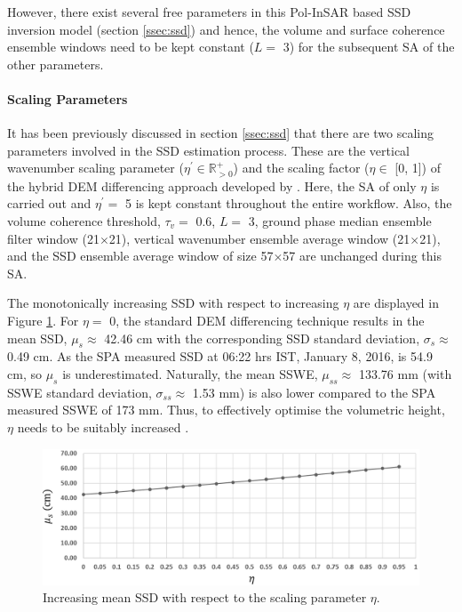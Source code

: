 \documentclass[review]{elsarticle}
\numberwithin{equation}{section}
\numberwithin{figure}{section}
\numberwithin{table}{section}
\begin{document}
However, there exist several free parameters in this Pol-InSAR based SSD inversion model (section \ref{ssec:ssd}) and hence, the volume and surface coherence ensemble windows need to be kept constant ($L =$ 3) for the subsequent SA of the other parameters.

\paragraph*{Scaling Parameters}

It has been previously discussed in section \ref{ssec:ssd} that there are two scaling parameters involved in the SSD estimation process. These are the vertical wavenumber scaling parameter ($\eta^\prime\in\mathbb{R}_{>0}^+$) and the scaling factor ($\eta\in$ [0, 1]) of the hybrid DEM differencing approach developed by \cite{Cloude2010}. Here, the SA of only $\eta$ is carried out and $\eta^\prime = $ 5 is kept constant throughout the entire workflow. Also, the volume coherence threshold, $\tau_v = $ 0.6, $L =$ 3, ground phase median ensemble filter window (21$\times$21), vertical wavenumber ensemble average window (21$\times$21), and the SSD ensemble average window of size 57$\times$57 are unchanged during this SA.

The monotonically increasing SSD with respect to increasing $\eta$ are displayed in Figure \ref{fig:eta}. For $\eta =$ 0, the standard DEM differencing technique \citep{Cloude2005} results in the mean SSD, $\mu_s \approx$ 42.46 cm with the corresponding SSD standard deviation, $\sigma_s \approx$ 0.49 cm. As the SPA measured SSD at 06:22 hrs IST, January 8, 2016, is 54.9 cm, so $\mu_s$ is underestimated. Naturally, the mean SSWE, $\mu_{ss} \approx$ 133.76 mm (with SSWE standard deviation, $\sigma_{ss} \approx$ 1.53 mm) is also lower compared to the SPA measured SSWE of 173 mm. Thus, to effectively optimise the volumetric height, $\eta$ needs to be suitably increased \citep{Cloude2005, Cloude2010}.

\begin{figure}[htb]
    \centering
    \includegraphics[width=\textwidth]{Figures/Results/Eta.png}
    \caption{Increasing mean SSD with respect to the scaling parameter $\eta$.}
    \label{fig:eta}
\end{figure}
\end{document}

